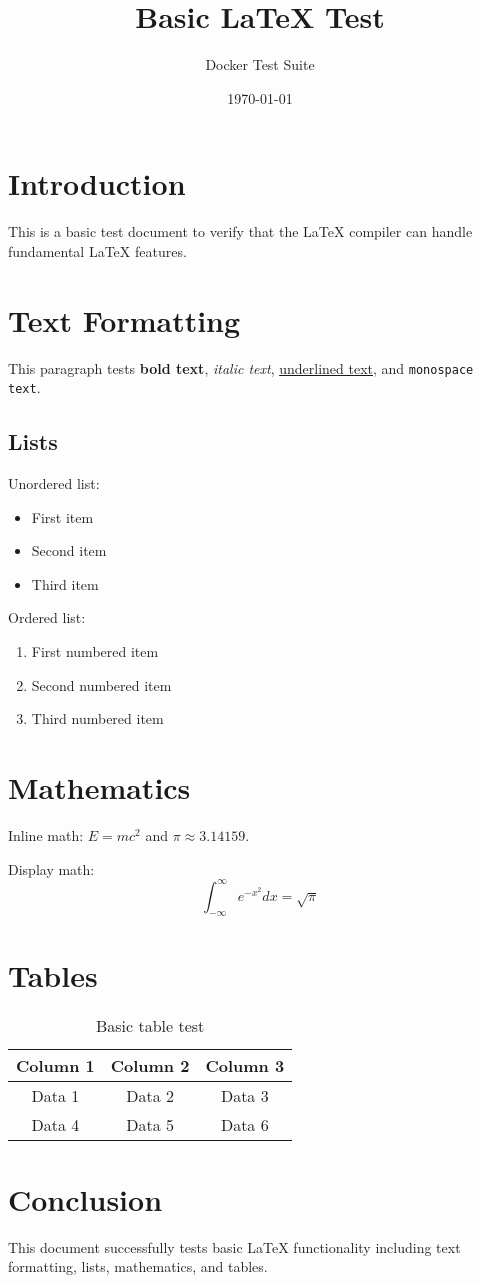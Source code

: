 \documentclass{article}
\title{Basic LaTeX Test}
\author{Docker Test Suite}
\date{\today}
\begin{document}
\maketitle

\section{Introduction}
This is a basic test document to verify that the LaTeX compiler can handle fundamental LaTeX features.

\section{Text Formatting}
This paragraph tests \textbf{bold text}, \textit{italic text}, \underline{underlined text}, and \texttt{monospace text}.

\subsection{Lists}
Unordered list:
\begin{itemize}
    \item First item
    \item Second item
    \item Third item
\end{itemize}

Ordered list:
\begin{enumerate}
    \item First numbered item
    \item Second numbered item
    \item Third numbered item
\end{enumerate}

\section{Mathematics}
Inline math: $E = mc^2$ and $\pi \approx 3.14159$.

Display math:
\[
\int_{-\infty}^{\infty} e^{-x^2} dx = \sqrt{\pi}
\]

\section{Tables}
\begin{table}[h]
\centering
\begin{tabular}{|c|c|c|}
\hline
Column 1 & Column 2 & Column 3 \\
\hline
Data 1 & Data 2 & Data 3 \\
Data 4 & Data 5 & Data 6 \\
\hline
\end{tabular}
\caption{Basic table test}
\end{table}

\section{Conclusion}
This document successfully tests basic LaTeX functionality including text formatting, lists, mathematics, and tables.
\end{document}
